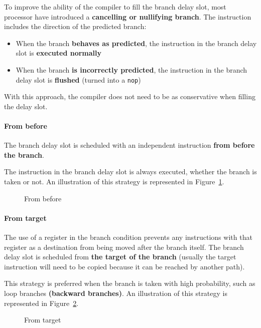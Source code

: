 \documentclass[english]{article}
\begin{document}
To improve the ability of the compiler to fill the branch delay slot, most processor have introduced a \textbf{cancelling or nullifying branch}.
The instruction includes the direction of the predicted branch:

\begin{itemize}
  \item When the branch \textbf{behaves as predicted}, the instruction in the branch delay slot is \textbf{executed normally}
  \item When the branch \textbf{is incorrectly predicted}, the instruction in the branch delay slot is \textbf{flushed} (turned into a \texttt{nop})
\end{itemize}

With this approach, the compiler does not need to be as conservative when filling the delay slot.

\paragraph{From before}

The branch delay slot is scheduled with an independent instruction \textbf{from before the branch}.

The instruction in the branch delay slot is always executed, whether the branch is taken or not.
An illustration of this strategy is represented in Figure~\ref{fig:from-before}.

\begin{figure}[htbp]
  \bigskip
  \centering
  \caption{From before}
  \label{fig:from-before}
  \bigskip
\end{figure}

\paragraph{From target}

The use of a register in the branch condition prevents any instructions with that register as a destination from being moved after the branch itself.
The branch delay slot is scheduled from \textbf{the target of the branch} (usually the target instruction will need to be copied because it can be reached by another path).

This strategy is preferred when the branch is taken with high probability, such as loop branches \textbf{(backward branches)}.
An illustration of this strategy is represented in Figure~\ref{fig:from-target}.

\begin{figure}[htbp]
  \bigskip
  \centering
  \caption{From target}
  \label{fig:from-target}
  \bigskip
\end{figure}
\end{document}
